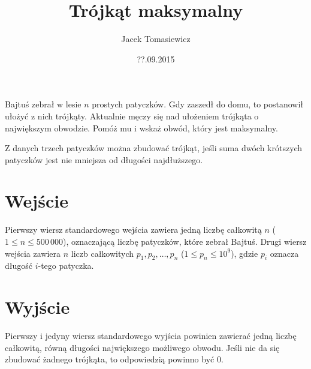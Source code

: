 \documentclass[zad,zawodnik,utf8]{sinol}
\title{Trójkąt maksymalny}
\date{??.09.2015}
\author{Jacek Tomasiewicz}
\begin{document}
  \begin{tasktext}%
	Bajtuś zebrał w lesie $n$ prostych patyczków. Gdy zaszedł do domu, to postanowił ułożyć z nich trójkąty. Aktualnie męczy się nad ułożeniem trójkąta o największym obwodzie. Pomóż mu i wskaż obwód, który jest maksymalny.

  Z danych trzech patyczków można zbudować trójkąt, jeśli suma dwóch krótszych patyczków jest nie mniejsza od długości najdłuższego.

    \section{Wejście}
	Pierwszy wiersz standardowego wejścia zawiera jedną liczbę całkowitą $n$ ($1 \leq n \leq 500\,000$), oznaczającą liczbę patyczków, które zebrał Bajtuś. Drugi wiersz wejścia zawiera $n$ liczb całkowitych $p_1, p_2, \ldots, p_n$ ($1 \leq p_n \leq 10^9$), gdzie $p_i$ oznacza długość $i$-tego patyczka.

    \section{Wyjście}
	Pierwszy i jedyny wiersz standardowego wyjścia powinien zawierać jedną liczbę całkowitą, równą długości największego możliwego obwodu. Jeśli nie da się zbudować żadnego trójkąta, to odpowiedzią powinno być 0.

    \makecompactexample

  \end{tasktext}
\end{document}
